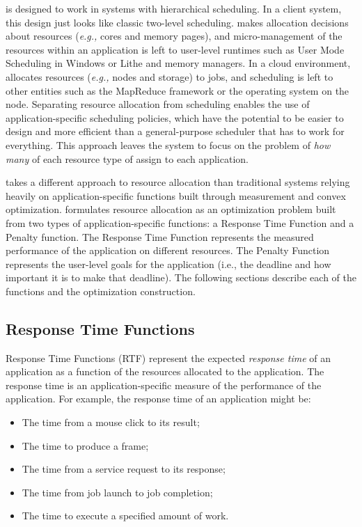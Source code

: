 \pacora is designed to work in systems with hierarchical scheduling.  In a client system, this design just looks like classic two-level scheduling.  \pacora makes allocation decisions about resources (\emph{e.g.,} cores and memory pages), and micro-management of the resources within an application is left to user-level runtimes such as User Mode Scheduling in Windows\cite{um_sched} or Lithe\cite{lithe} and memory managers.  In a cloud environment, \pacora allocates resources (\emph{e.g.,} nodes and storage) to jobs, and scheduling is left to other entities such as the MapReduce framework\cite{mapreduce} or the operating system on the node.  Separating resource allocation from scheduling enables the use of application-specific scheduling policies, which have the potential to be easier to design and more efficient than a general-purpose scheduler that has to work for everything.   This approach leaves the system to focus on the problem of \emph{how many} of each resource type of assign to each application. 

\pacora takes a different approach to resource allocation than traditional systems relying heavily on application-specific functions built through measurement and convex optimization. \pacora formulates resource allocation as an optimization problem built from two types of application-specific functions: a Response Time Function and a Penalty function. The Response Time Function represents the measured performance of the application on different resources.  The Penalty Function represents the user-level goals for the application (i.e., the deadline and how important it is to make that deadline). The following sections describe each of the functions and the optimization construction.

\subsection*{Response Time Functions}

Response Time Functions (RTF) represent the expected \emph{response time} of an application as a function of the resources allocated to the application. The response time is an application-specific measure of the performance of the application.
    For example, the response time of an application might be:
    \begin{itemize}\itemsep0pt \parskip0pt 
    \item The time from a mouse click to its result;
    \item The time to produce a frame;
    \item The time from a service request to its response;
    \item The time from job launch to job completion;
    \item The time to execute a specified amount of work.
    \end{itemize}
    
